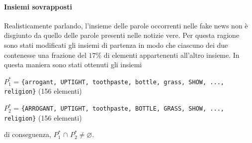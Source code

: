 \documentclass[12pt]{report}
\theoremstyle{definition}
\let\emptyset\varnothing
\begin{document}
\paragraph{Insiemi sovrapposti}
Realisticamente parlando, l'insieme delle parole occorrenti nelle fake news non è disgiunto da quello delle parole presenti nelle notizie vere.
Per questa ragione sono stati modificati gli insiemi di partenza in modo che ciascuno dei due contenesse una frazione del $17 \%$ di elementi appartenenti all'altro insieme. In questa maniera sono stati ottenuti gli insiemi
\begin{center}
    $P_{1}^{*}$ = \texttt{\{arrogant, UPTIGHT, toothpaste, bottle, grass, SHOW, ..., religion\}} (156 elementi)
\end{center}
\begin{center}
    $P_{2}^{*}$ = \texttt{\{ARROGANT, UPTIGHT, toothpaste, BOTTLE, GRASS, SHOW, ..., religion\}} (156 elementi)
\end{center}
di conseguenza, $P_{1}^{*}$ $\cap$ $P_{2}^{*} \neq \emptyset$.
\end{document}
